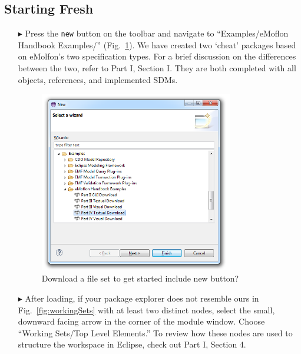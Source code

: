 \subsection{Starting Fresh}
\label{sec:loadSourceMeta}
\begin{itemize}

\item[$\blacktriangleright$] Press the \texttt{new} button on the toolbar and navigate to ``Examples/eMoflon Handbook Examples/''
(Fig.~\ref{fig:downPartIV}).  We have created two `cheat' packages based on eMolfon's two specification types. For a brief discussion on the differences between
the two, refer to Part I, Section I. They are both completed with all objects, references, and implemented SDMs.

\begin{figure}[htbp]
\begin{center}
  \includegraphics[width=0.8\textwidth]{eclipse_downloadWizardPartIV}
  \caption{Download a file set to get started \update include new button?}
  \label{fig:downPartIV}
\end{center}
\end{figure}

\item[$\blacktriangleright$] After loading, if your package explorer does not resemble ours in Fig.~\ref{fig:workingSets} with at least two
distinct nodes, select the small, downward facing arrow in the corner of the module window. Choose ``Working Sets/Top Level Elements.'' To review how these
nodes are used to structure the workspace in Eclipse, check out Part I, Section 4.


\end{itemize}
